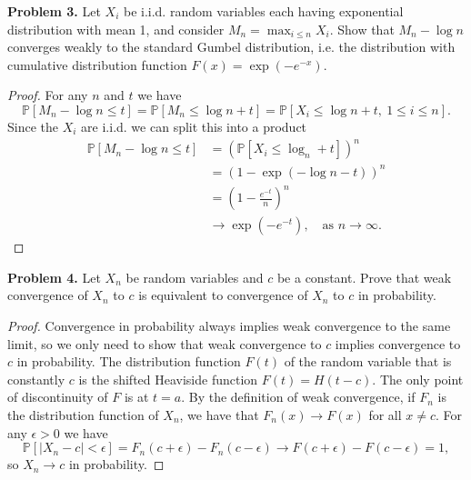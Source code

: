 \documentclass[11pt,letterpaper]{report}
\newcommand{\Prob}{\mathbb{P}}
\begin{document}
\noindent\textbf{Problem 3. }
Let $X_i$ be i.i.d. random variables each having exponential distribution with mean 1, and consider $M_n = \max_{i\leq n}X_i$. Show that $M_n - \log n$ converges weakly to the standard Gumbel distribution, i.e. the distribution with cumulative distribution function $F(x) = \exp(-e^{-x})$.
\begin{proof}
	For any $n$ and $t$ we have
	\[
	\Prob[M_n - \log n \leq t] = \Prob[M_n \leq \log n + t] = \Prob[X_i\leq \log n + t,\ 1\leq i\leq n].
	\]
	Since the $X_i$ are i.i.d. we can split this into a product
	\begin{align*}
	\Prob[M_n-\log n\leq t] &= \left(\Prob[X_i \leq \log_n + t]\right)^n\\
	&= \left(1 - \exp(-\log n  -t)\right)^n\\
	&= \left(1 - \frac{e^{-t}}{n}\right)^n\\
	&\to \exp(-e^{-t}),\quad \text{as }n\to \infty.
	\end{align*}
\end{proof}

\noindent\textbf{Problem 4. }Let $X_n$ be random variables and $c$ be a constant. Prove that weak convergence of $X_n$ to $c$ is equivalent to convergence of $X_n$ to $c$ in probability.
\begin{proof}
	Convergence in probability always implies weak convergence to the same limit, so we only need to show that weak convergence to $c$ implies convergence to $c$ in probability. The distribution function $F(t)$ of the random variable that is constantly $c$ is the shifted Heaviside function $F(t) = H(t-c)$. The only point of discontinuity of $F$ is at $t= a$. By the definition of weak convergence, if $F_n$ is the distribution function of $X_n$, we have that $F_n(x)\to F(x)$ for all $x\neq c$. For any $\epsilon>0$ we have
	\[
	\Prob[|X_n - c|<\epsilon] = F_n(c+\epsilon)-F_n(c-\epsilon)\to F(c+\epsilon) - F(c-\epsilon) = 1,
	\]
	so $X_n\to c$ in probability.
\end{proof}
\end{document}
